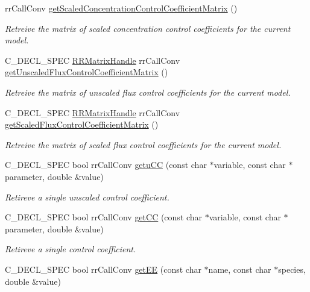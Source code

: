 \begin{DoxyCompactItemize}
rr\-Call\-Conv \hyperlink{group__utility_gad28644ca7615c71725056028a0a048ba}{get\-Scaled\-Concentration\-Control\-Coefficient\-Matrix} ()
\begin{DoxyCompactList}\small\item\em \-Retreive the matrix of scaled concentration control coefficients for the current model. \end{DoxyCompactList}\item 
\-C\-\_\-\-D\-E\-C\-L\-\_\-\-S\-P\-E\-C \hyperlink{rr__c__types_8h_a87174eefa58ae98dec58c9253ae6c5da}{\-R\-R\-Matrix\-Handle} \*
rr\-Call\-Conv \hyperlink{group__utility_ga4b464166bb67773916067bc7e190a338}{get\-Unscaled\-Flux\-Control\-Coefficient\-Matrix} ()
\begin{DoxyCompactList}\small\item\em \-Retreive the matrix of unscaled flux control coefficients for the current model. \end{DoxyCompactList}\item 
\-C\-\_\-\-D\-E\-C\-L\-\_\-\-S\-P\-E\-C \hyperlink{rr__c__types_8h_a87174eefa58ae98dec58c9253ae6c5da}{\-R\-R\-Matrix\-Handle} \*
rr\-Call\-Conv \hyperlink{group__utility_gad63647a85b299d463b1e4cd5671d0881}{get\-Scaled\-Flux\-Control\-Coefficient\-Matrix} ()
\begin{DoxyCompactList}\small\item\em \-Retreive the matrix of scaled flux control coefficients for the current model. \end{DoxyCompactList}\item 
\-C\-\_\-\-D\-E\-C\-L\-\_\-\-S\-P\-E\-C bool rr\-Call\-Conv \hyperlink{group__utility_ga6655b7aebdc9e6fad4e7a54e3de9195d}{getu\-C\-C} (const char $\ast$variable, const char $\ast$parameter, double \&value)
\begin{DoxyCompactList}\small\item\em \-Retireve a single unscaled control coefficient. \end{DoxyCompactList}\item 
\-C\-\_\-\-D\-E\-C\-L\-\_\-\-S\-P\-E\-C bool rr\-Call\-Conv \hyperlink{group__utility_ga49c703842a069c37fa472f2740dd514b}{get\-C\-C} (const char $\ast$variable, const char $\ast$parameter, double \&value)
\begin{DoxyCompactList}\small\item\em \-Retireve a single control coefficient. \end{DoxyCompactList}\item 
\-C\-\_\-\-D\-E\-C\-L\-\_\-\-S\-P\-E\-C bool rr\-Call\-Conv \hyperlink{group__utility_ga761a98e3635d75c8505f516a0b2384b1}{get\-E\-E} (const char $\ast$name, const char $\ast$species, double \&value)

\end{DoxyCompactItemize}
